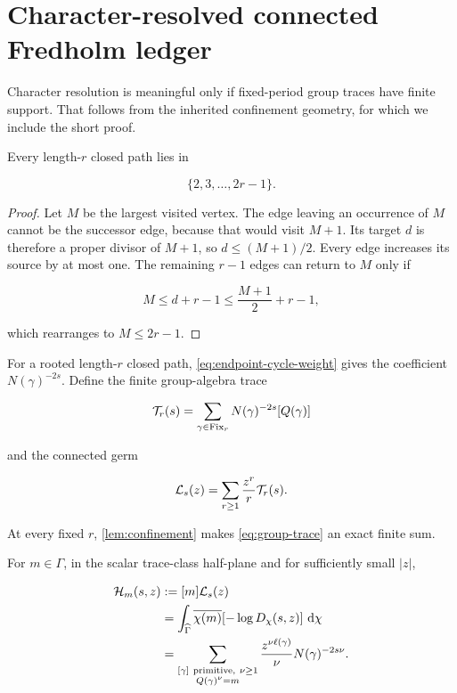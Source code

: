 \section{Character-resolved connected Fredholm ledger}
\label{sec:ledger}

Character resolution is meaningful only if fixed-period group traces have
finite support.  That follows from the inherited confinement geometry, for
which we include the short proof.

\begin{lemma}
\label{lem:confinement}
Every length-\(r\) closed path lies in

\[
 \{2,3,\ldots,2r-1\}.
\]
\end{lemma}

\begin{proof}
Let \(M\) be the largest visited vertex.  The edge leaving an occurrence of
\(M\) cannot be the successor edge, because that would visit \(M+1\).  Its
target \(d\) is therefore a proper divisor of \(M+1\), so
\(d\le(M+1)/2\).  Every edge increases its source by at most one.  The
remaining \(r-1\) edges can return to \(M\) only if

\[
 M\le d+r-1\le\frac{M+1}{2}+r-1,
\]

which rearranges to \(M\le2r-1\).
\end{proof}

For a rooted length-\(r\) closed path, \cref{eq:endpoint-cycle-weight} gives
the coefficient \(N(\gamma)^{-2s}\).  Define the finite group-algebra trace

\begin{equation}
 \mathcal T_r(s)=
 \sum_{\gamma\in\operatorname{Fix}_r}N(\gamma)^{-2s}[Q(\gamma)]
\label{eq:group-trace}
\end{equation}

and the connected germ

\begin{equation}
 \mathcal L_s(z)=\sum_{r\ge1}\frac{z^r}{r}\mathcal T_r(s).
\label{eq:connected-ledger}
\end{equation}

At every fixed \(r\), \cref{lem:confinement} makes
\cref{eq:group-trace} an exact finite sum.

\begin{theorem}
\label{thm:coefficient}
For \(m\in\Gamma\), in the scalar trace-class half-plane and for sufficiently
small \(|z|\),

\begin{align}
 \mathcal H_m(s,z)
 &:=[m]\mathcal L_s(z) \notag\\
 &=\int_{\widehat\Gamma}\overline{\chi(m)}
   [-\log D_\chi(s,z)]\,\,\mathrm d\chi \notag\\
 &=\sum_{\substack{[\gamma]\ \mathrm{primitive},\ \nu\ge1\\
                    Q(\gamma)^\nu=m}}
   \frac{z^{\nu\ell(\gamma)}}{\nu}
   N(\gamma)^{-2s\nu}.
\label{eq:coefficient-formula}
\end{align}
\end{theorem}

